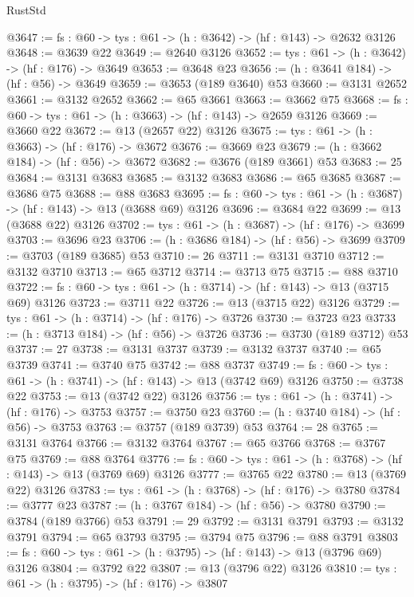 \begin{lexlean}{RustStd}
\begin{coremodule}
{\begin{coremodule}
{{{{{{{{{{{{@3647 := {fs : @60} -> {tys : @61} -> (h : @3642) -> (hf : @143) -> @2632 @3126
@3648 := @3639 @22
@3649 := @2640 @3126
@3652 := {tys : @61} -> (h : @3642) -> (hf : @176) -> @3649
@3653 := @3648 @23
@3656 := (h : @3641 @184) -> (hf : @56) -> @3649
@3659 := @3653 (@189 @3640) @53
@3660 := @3131 @2652
@3661 := @3132 @2652
@3662 := @65 @3661
@3663 := @3662 @75
@3668 := {fs : @60} -> {tys : @61} -> (h : @3663) -> (hf : @143) -> @2659 @3126
@3669 := @3660 @22
@3672 := @13 (@2657 @22) @3126
@3675 := {tys : @61} -> (h : @3663) -> (hf : @176) -> @3672
@3676 := @3669 @23
@3679 := (h : @3662 @184) -> (hf : @56) -> @3672
@3682 := @3676 (@189 @3661) @53
@3683 := 25
@3684 := @3131 @3683
@3685 := @3132 @3683
@3686 := @65 @3685
@3687 := @3686 @75
@3688 := @88 @3683
@3695 := {fs : @60} -> {tys : @61} -> (h : @3687) -> (hf : @143) -> @13 (@3688 @69) @3126
@3696 := @3684 @22
@3699 := @13 (@3688 @22) @3126
@3702 := {tys : @61} -> (h : @3687) -> (hf : @176) -> @3699
@3703 := @3696 @23
@3706 := (h : @3686 @184) -> (hf : @56) -> @3699
@3709 := @3703 (@189 @3685) @53
@3710 := 26
@3711 := @3131 @3710
@3712 := @3132 @3710
@3713 := @65 @3712
@3714 := @3713 @75
@3715 := @88 @3710
@3722 := {fs : @60} -> {tys : @61} -> (h : @3714) -> (hf : @143) -> @13 (@3715 @69) @3126
@3723 := @3711 @22
@3726 := @13 (@3715 @22) @3126
@3729 := {tys : @61} -> (h : @3714) -> (hf : @176) -> @3726
@3730 := @3723 @23
@3733 := (h : @3713 @184) -> (hf : @56) -> @3726
@3736 := @3730 (@189 @3712) @53
@3737 := 27
@3738 := @3131 @3737
@3739 := @3132 @3737
@3740 := @65 @3739
@3741 := @3740 @75
@3742 := @88 @3737
@3749 := {fs : @60} -> {tys : @61} -> (h : @3741) -> (hf : @143) -> @13 (@3742 @69) @3126
@3750 := @3738 @22
@3753 := @13 (@3742 @22) @3126
@3756 := {tys : @61} -> (h : @3741) -> (hf : @176) -> @3753
@3757 := @3750 @23
@3760 := (h : @3740 @184) -> (hf : @56) -> @3753
@3763 := @3757 (@189 @3739) @53
@3764 := 28
@3765 := @3131 @3764
@3766 := @3132 @3764
@3767 := @65 @3766
@3768 := @3767 @75
@3769 := @88 @3764
@3776 := {fs : @60} -> {tys : @61} -> (h : @3768) -> (hf : @143) -> @13 (@3769 @69) @3126
@3777 := @3765 @22
@3780 := @13 (@3769 @22) @3126
@3783 := {tys : @61} -> (h : @3768) -> (hf : @176) -> @3780
@3784 := @3777 @23
@3787 := (h : @3767 @184) -> (hf : @56) -> @3780
@3790 := @3784 (@189 @3766) @53
@3791 := 29
@3792 := @3131 @3791
@3793 := @3132 @3791
@3794 := @65 @3793
@3795 := @3794 @75
@3796 := @88 @3791
@3803 := {fs : @60} -> {tys : @61} -> (h : @3795) -> (hf : @143) -> @13 (@3796 @69) @3126
@3804 := @3792 @22
@3807 := @13 (@3796 @22) @3126
@3810 := {tys : @61} -> (h : @3795) -> (hf : @176) -> @3807
}}}}}}}}}}}}
\end{coremodule}}
\end{coremodule}
\end{lexlean}
